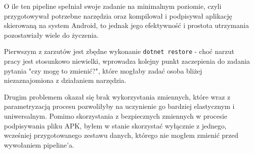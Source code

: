\newpage

O ile ten pipeline spełniał swoje zadanie na minimalnym poziomie, czyli przygotowywał potrzebne narzędzia 
oraz kompilował i podpisywał aplikację skierowaną na system Android, to jednak jego efektywność i prostota 
utrzymania pozostawiały wiele do życzenia.

Pierwszym z zarzutów jest zbędne wykonanie \verb|dotnet restore| - choć narzut pracy 
jest stosunkowo niewielki, wprowadza kolejny punkt zaczepienia do zadania pytania "czy mogę to zmienić?", 
które mogłaby zadać osoba bliżej niezaznajomiona z działaniem narzędzia.

Drugim problemem okazał się brak wykorzystania zmiennych, które wraz z parametryzacją procesu 
pozwoliłyby na uczynienie go bardziej elastycznym i uniwersalnym. 
Pomimo skorzystania z bezpiecznych zmiennych w procesie podpisywania pliku APK, 
byłem w stanie skorzystać wyłącznie z jednego, wcześniej przygotowanego zestawu danych, 
którego nie mogłem zmienić przed wywołaniem pipeline'a.

